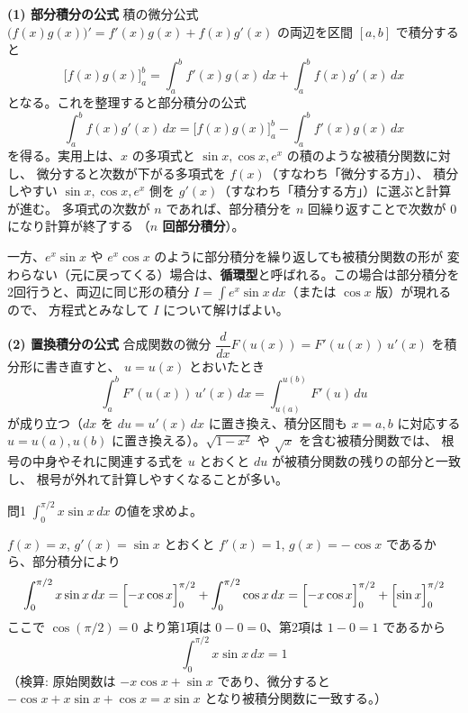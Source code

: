 \documentclass[a4paper,11pt]{article}
\begin{document}


\noindent
\textbf{(1) 部分積分の公式}\quad
積の微分公式 $\bigl(f(x)g(x)\bigr)' = f'(x)g(x) + f(x)g'(x)$ の両辺を区間 $[a,b]$ で積分すると
\[
\bigl[f(x)g(x)\bigr]_{a}^{b} = \int_{a}^{b} f'(x)g(x)\,dx + \int_{a}^{b} f(x)g'(x)\,dx
\]
となる。これを整理すると部分積分の公式
\[
\int_{a}^{b} f(x)g'(x)\,dx = \bigl[f(x)g(x)\bigr]_{a}^{b} - \int_{a}^{b} f'(x)g(x)\,dx
\]
を得る。実用上は、$x$ の多項式と $\sin x,\cos x, e^{x}$ の積のような被積分関数に対し、
微分すると次数が下がる多項式を $f(x)$（すなわち「微分する方」）、
積分しやすい $\sin x,\cos x, e^{x}$ 側を $g'(x)$（すなわち「積分する方」）に選ぶと計算が進む。
多項式の次数が $n$ であれば、部分積分を $n$ 回繰り返すことで次数が $0$ になり計算が終了する
（\textbf{$n$ 回部分積分}）。

一方、$e^{x}\sin x$ や $e^{x}\cos x$ のように部分積分を繰り返しても被積分関数の形が
変わらない（元に戻ってくる）場合は、\textbf{循環型}と呼ばれる。この場合は部分積分を
2回行うと、両辺に同じ形の積分 $I = \int e^{x}\sin x\,dx$（または $\cos x$ 版）が現れるので、
方程式とみなして $I$ について解けばよい。

\medskip
\noindent
\textbf{(2) 置換積分の公式}\quad
合成関数の微分 $\dfrac{d}{dx}F(u(x)) = F'(u(x))\,u'(x)$ を積分形に書き直すと、
$u = u(x)$ とおいたとき
\[
\int_{a}^{b} F'(u(x))\,u'(x)\,dx = \int_{u(a)}^{u(b)} F'(u)\,du
\]
が成り立つ（$dx$ を $du = u'(x)\,dx$ に置き換え、積分区間も $x=a,b$ に対応する
$u=u(a), u(b)$ に置き換える）。$\sqrt{1-x^{2}}$ や $\sqrt{x}$ を含む被積分関数では、
根号の中身やそれに関連する式を $u$ とおくと $du$ が被積分関数の残りの部分と一致し、
根号が外れて計算しやすくなることが多い。

\clearpage
\begin{mondaiboxS}{問1}
$\displaystyle\int_{0}^{\pi/2} x\sin x\,dx$ の値を求めよ。
\end{mondaiboxS}
\kaitou
$f(x) = x$, $g'(x) = \sin x$ とおくと $f'(x) = 1$, $g(x) = -\cos x$ であるから、部分積分により
\[
\int_{0}^{\pi/2} x\sin x\,dx
= \Bigl[-x\cos x\Bigr]_{0}^{\pi/2} + \int_{0}^{\pi/2} \cos x\,dx
= \Bigl[-x\cos x\Bigr]_{0}^{\pi/2} + \Bigl[\sin x\Bigr]_{0}^{\pi/2}
\]
ここで $\cos(\pi/2) = 0$ より第1項は $0 - 0 = 0$、第2項は $1 - 0 = 1$ であるから
\[
\boxed{\; \int_{0}^{\pi/2} x\sin x\,dx = 1 \;}
\]
（検算: 原始関数は $-x\cos x + \sin x$ であり、微分すると
$-\cos x + x\sin x + \cos x = x\sin x$ となり被積分関数に一致する。）
\end{document}
